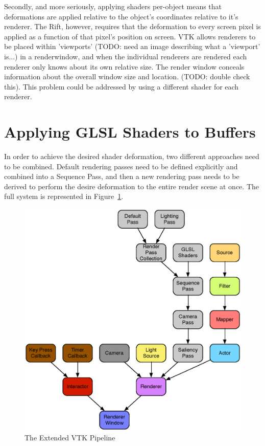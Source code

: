 \documentclass[MSc,paper=a4,pagesize=auto]{icldt}
\begin{document}
Secondly, and more seriously, applying shaders per-object means that deformations are applied relative to the object's coordinates relative to it's renderer. The Rift, however, requires that the deformation to every screen pixel is applied as a function of that pixel's position on screen. VTK allows renderers to be placed within 'viewports' (TODO: need an image describing what a 'viewport' is...) in a renderwindow, and when the individual renderers are rendered each renderer only knows about its own relative size. The render window conceals information about the overall window size and location. (TODO: double check this). This problem could be addressed by using a different shader for each renderer.


\section{Applying GLSL Shaders to Buffers}
In order to achieve the desired shader deformation, two different approaches need to be combined. Default rendering passes need to be defined explicitly and combined into a Sequence Pass, and then a new rendering pass needs to be derived to perform the desire deformation to the entire render scene at once. The full system is represented in Figure~\ref{fig:vtk_extended_pipeline}.

\begin{figure}[htbp!]
    \centering
    \includegraphics[width=1\textwidth]{resources/vtk_extended_pipeline}
    \caption{The Extended VTK Pipeline}
    \label{fig:vtk_extended_pipeline}
\end{figure}
\end{document}
